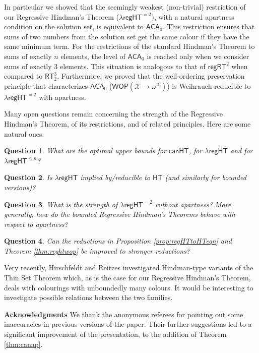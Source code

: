 \documentclass[a4paper,11pt]{article}
\newtheorem{question}{Question}
\newcommand\ACA{\mathsf{ACA}}
\newcommand\HT{\mathsf{HT}}
\newcommand\RT{\mathsf{RT}}
\newcommand\regHT{\mathsf{regHT}}
\newcommand\canHT{\mathsf{canHT}}
\newcommand\REG{\mathsf{regRT}}
\newcommand\ordX{\mathcal{X}}
\newcommand\WOP{\mathsf{WOP}}
\begin{document}
In particular we showed that the seemingly weakest (non-trivial) restriction of our Regressive Hindman's Theorem ($\lambda\regHT^{=2}$), with a natural apartness condition on the solution set, is equivalent
to $\ACA_0$. This restriction ensures that sums of two numbers from the solution set get the same colour if they have the same minimum term. For the restrictions of the standard Hindman's Theorem to sums of exactly $n$ elements, the level of $\ACA_0$ is reached only when we consider sums of exactly $3$ elements. This situation is analogous to that of $\REG^2$ 
when compared to $\RT^3_2$. Furthermore, we proved that the well-ordering preservation principle that characterizes $\ACA_0$ ($\WOP(\ordX \to \omega^\ordX)$) is Weihrauch-reducible to $\lambda\regHT^{=2}$ with apartness.

Many open questions remain concerning the strength of the Regressive Hindman's Theorem, of its restrictions, and of related principles. Here are some natural ones. 

\begin{question}
What are the optimal upper bounds for $\canHT$, for $\lambda\regHT$ and for $\lambda\regHT^{\leq n}$?
\end{question}

\begin{question}
Is $\lambda\regHT$ implied by/reducible to $\HT$ (and similarly for bounded versions)?
\end{question}

\begin{question}
What is the strength of $\lambda\regHT^{=2}$ without apartness? More generally, how do the bounded Regressive Hindman's Theorems behave with respect to apartness?
\end{question}

\begin{question}
Can the reductions in Proposition \ref{prop:regHTtoHTeqn} and Theorem \ref{thm:reghtwop} be improved to stronger reductions?
\end{question}

Very recently, Hirschfeldt and Reitzes \cite{Hir-Rei:pre} investigated Hindman-type variants of the Thin Set Theorem which, as is the case
for our Regressive Hindman's Theorem, deals with colourings with unboundedly many colours. It would be interesting to 
investigate possible relations between the two families. 

\bigskip
{\bf Acknowledgments} We thank the anonymous referees for pointing out some inaccuracies in previous versions of the paper. 
Their further suggestions led to a significant improvement of the presentation, to the addition of Theorem \ref{thm:canap}.
\end{document}
